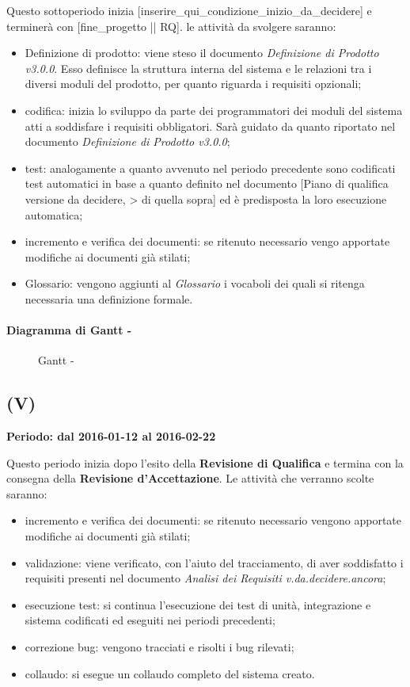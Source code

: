 \documentclass[./PianoDiProgetto.tex]{subfiles}
\begin{document}
  Questo sottoperiodo inizia [inserire_qui_condizione_inizio_da_decidere] e terminerà con [fine_progetto || RQ]. le attività da svolgere saranno:
  \begin{itemize}
    \item Definizione di prodotto: viene steso il documento \textit{Definizione di Prodotto v3.0.0}. Esso definisce la struttura interna del sistema e le relazioni tra i diversi moduli del prodotto, per quanto riguarda i requisiti opzionali;
    \item codifica: inizia lo sviluppo da parte dei programmatori dei moduli del sistema atti a soddisfare i requisiti obbligatori. Sarà guidato da quanto riportato nel documento \textit{Definizione di Prodotto v3.0.0};
    \item test: analogamente a quanto avvenuto nel periodo precedente sono codificati test automatici in base a quanto definito nel documento [Piano di qualifica versione da decidere, > di quella sopra] ed è predisposta la loro esecuzione automatica;
    \item incremento e verifica dei documenti: se ritenuto necessario vengo apportate modifiche ai documenti già stilati;
    \item Glossario: vengono aggiunti al \textit{Glossario} i vocaboli dei quali si ritenga necessaria una definizione formale.
  \end{itemize}

  \paragraph{Diagramma di Gantt - \PerPDROP}
    \begin{figure}[!h]
    \centering
    \caption{Gantt - \PerPDROP}
    \end{figure}

  \subsection{\PerV (V)}
  \textbf{Periodo: dal 2016-01-12 al 2016-02-22}

  Questo periodo inizia dopo l'esito della \textbf{Revisione di Qualifica} e termina con la consegna della \textbf{Revisione d'Accettazione}. Le attività che verranno scolte saranno:
  \begin{itemize}
    \item incremento e verifica dei documenti: se ritenuto necessario vengono apportate modifiche ai documenti già stilati;
    \item validazione: viene verificato, con l'aiuto del tracciamento, di aver soddisfatto i requisiti presenti nel documento \textit{Analisi dei Requisiti v.da.decidere.ancora};
    \item esecuzione test: si continua l'esecuzione dei test di unità, integrazione e sistema codificati ed eseguiti nei periodi precedenti;
    \item correzione bug: vengono tracciati e risolti i bug rilevati;
    \item collaudo: si esegue un collaudo completo del sistema creato.
  \end{itemize}
\end{document}
